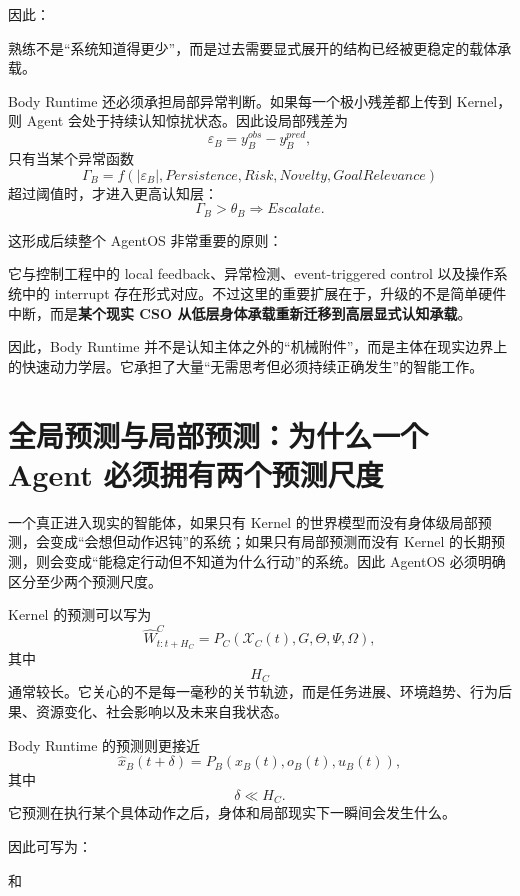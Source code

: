 因此：
\begin{statementbox}
\centering
{}
\end{statementbox}
熟练不是“系统知道得更少”，而是过去需要显式展开的结构已经被更稳定的载体承载。

Body Runtime 还必须承担局部异常判断。如果每一个极小残差都上传到 Kernel，则 Agent 会处于持续认知惊扰状态。因此设局部残差为
\[
\varepsilon_B
=
y_B^{obs}
-
y_B^{pred},
\]
只有当某个异常函数
\[
\Gamma_B
=
f
\left(
|\varepsilon_B|,
Persistence,
Risk,
Novelty,
GoalRelevance
\right)
\]
超过阈值时，才进入更高认知层：
\[
\Gamma_B>\theta_B
\Rightarrow
Escalate.
\]

这形成后续整个 AgentOS 非常重要的原则：
\begin{statementbox}
\centering
{}
\end{statementbox}

它与控制工程中的 local feedback、异常检测、event-triggered control 以及操作系统中的 interrupt 存在形式对应。不过这里的重要扩展在于，升级的不是简单硬件中断，而是\textbf{某个现实 CSO 从低层身体承载重新迁移到高层显式认知承载}。

因此，Body Runtime 并不是认知主体之外的“机械附件”，而是主体在现实边界上的快速动力学层。它承担了大量“无需思考但必须持续正确发生”的智能工作。

\section{全局预测与局部预测：为什么一个 Agent 必须拥有两个预测尺度}

一个真正进入现实的智能体，如果只有 Kernel 的世界模型而没有身体级局部预测，会变成“会想但动作迟钝”的系统；如果只有局部预测而没有 Kernel 的长期预测，则会变成“能稳定行动但不知道为什么行动”的系统。因此 AgentOS 必须明确区分至少两个预测尺度。

Kernel 的预测可以写为
\[
\hat W^{C}_{t:t+H_C}
=
P_C
\left(
\mathcal X_C(t),
G,
\Theta,
\Psi,
\Omega
\right),
\]
其中
\[
H_C
\]
通常较长。它关心的不是每一毫秒的关节轨迹，而是任务进展、环境趋势、行为后果、资源变化、社会影响以及未来自我状态。

Body Runtime 的预测则更接近
\[
\hat x_B(t+\delta)
=
P_B
\left(
x_B(t),
o_B(t),
u_B(t)
\right),
\]
其中
\[
\delta\ll H_C.
\]
它预测在执行某个具体动作之后，身体和局部现实下一瞬间会发生什么。

因此可写为：
\begin{statementbox}
\centering
{}
\end{statementbox}
和
\begin{statementbox}
\centering
{}
\end{statementbox}

